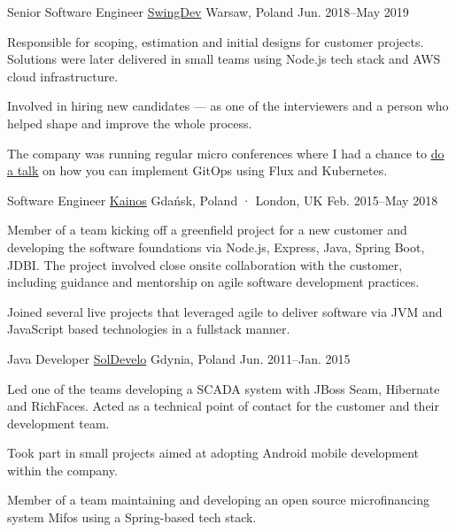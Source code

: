 \begin{cventries}
  \cventry
    {Senior Software Engineer} %
    {\href{https://www.swing.dev}{SwingDev}} %
    {Warsaw, Poland} %
    {Jun. 2018–May 2019} %
    {
      \begin {cvitems} %
        \item {Responsible for scoping, estimation and initial designs for customer projects. Solutions were later delivered in small teams using Node.js tech stack and AWS cloud infrastructure.}
        \item {Involved in hiring new candidates — as one of the interviewers and a person who helped shape and improve the whole process.}
        \item {The company was running regular micro conferences where I had a chance to \href{https://www.youtube.com/watch?v=5zt-jzKHwX8}{\underline{do a talk}} on how you can implement GitOps using Flux and Kubernetes.}
      \end {cvitems}
    }

  \cventry
    {Software Engineer} %
    {\href{https://www.kainos.com}{Kainos}} %
    {Gdańsk, Poland · London, UK} %
    {Feb. 2015–May 2018} %
    {
      \begin{cvitems} %
        \item {Member of a team kicking off a greenfield project for a new customer and developing the software foundations via Node.js, Express, Java, Spring Boot, JDBI. The project involved close onsite collaboration with the customer, including guidance and mentorship on agile software development practices.}
        \item {Joined several live projects that leveraged agile to deliver software via JVM and JavaScript based technologies in a fullstack manner.}
      \end{cvitems}
    }

  \cventry
    {Java Developer} %
    {\href{https://www.soldevelo.com}{SolDevelo}} %
    {Gdynia, Poland} %
    {Jun. 2011–Jan. 2015} %
    {
      \begin{cvitems} %
        \item {Led one of the teams developing a SCADA system with JBoss Seam, Hibernate and RichFaces. Acted as a technical point of contact for the customer and their development team.}
        \item {Took part in small projects aimed at adopting Android mobile development within the company.}
        \item {Member of a team maintaining and developing an open source microfinancing system Mifos using a Spring-based tech stack.}
      \end{cvitems}
    }

\end{cventries}
